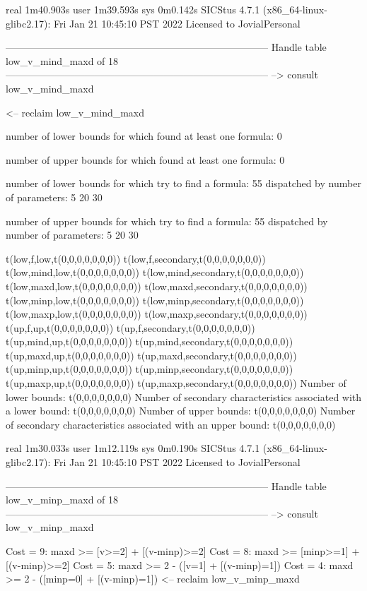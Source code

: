 real	1m40.903s
user	1m39.593s
sys	0m0.142s
SICStus 4.7.1 (x86_64-linux-glibc2.17): Fri Jan 21 10:45:10 PST 2022
Licensed to JovialPersonal


--------------------------------------------------------------------------------
Handle table low_v_mind_maxd of 18
--------------------------------------------------------------------------------
--> consult low_v_mind_maxd

<-- reclaim low_v_mind_maxd

number of lower bounds for which found at least one formula: 0

number of upper bounds for which found at least one formula: 0

number of lower bounds for which try to find a formula: 55
dispatched by number of parameters: 5  20  30

number of upper bounds for which try to find a formula: 55
dispatched by number of parameters: 5  20  30

t(low,f,low,t(0,0,0,0,0,0,0))
t(low,f,secondary,t(0,0,0,0,0,0,0))
t(low,mind,low,t(0,0,0,0,0,0,0))
t(low,mind,secondary,t(0,0,0,0,0,0,0))
t(low,maxd,low,t(0,0,0,0,0,0,0))
t(low,maxd,secondary,t(0,0,0,0,0,0,0))
t(low,minp,low,t(0,0,0,0,0,0,0))
t(low,minp,secondary,t(0,0,0,0,0,0,0))
t(low,maxp,low,t(0,0,0,0,0,0,0))
t(low,maxp,secondary,t(0,0,0,0,0,0,0))
t(up,f,up,t(0,0,0,0,0,0,0))
t(up,f,secondary,t(0,0,0,0,0,0,0))
t(up,mind,up,t(0,0,0,0,0,0,0))
t(up,mind,secondary,t(0,0,0,0,0,0,0))
t(up,maxd,up,t(0,0,0,0,0,0,0))
t(up,maxd,secondary,t(0,0,0,0,0,0,0))
t(up,minp,up,t(0,0,0,0,0,0,0))
t(up,minp,secondary,t(0,0,0,0,0,0,0))
t(up,maxp,up,t(0,0,0,0,0,0,0))
t(up,maxp,secondary,t(0,0,0,0,0,0,0))
Number of lower bounds:                                             t(0,0,0,0,0,0,0)
Number of secondary characteristics associated with a lower bound:  t(0,0,0,0,0,0,0)
Number of upper bounds:                                             t(0,0,0,0,0,0,0)
Number of secondary characteristics associated with an upper bound: t(0,0,0,0,0,0,0)

real	1m30.033s
user	1m12.119s
sys	0m0.190s
SICStus 4.7.1 (x86_64-linux-glibc2.17): Fri Jan 21 10:45:10 PST 2022
Licensed to JovialPersonal


--------------------------------------------------------------------------------
Handle table low_v_minp_maxd of 18
--------------------------------------------------------------------------------
--> consult low_v_minp_maxd

Cost =  9:  maxd >= [v>=2] + [(v-minp)>=2]
Cost =  8:  maxd >= [minp>=1] + [(v-minp)>=2]
Cost =  5:  maxd >= 2 - ([v=1] + [(v-minp)=1])
Cost =  4:  maxd >= 2 - ([minp=0] + [(v-minp)=1])
<-- reclaim low_v_minp_maxd


